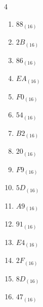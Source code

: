 \begin{multicols}{4}
\begin{enumerate}
  \item $88_{(16)}$

        \phantom{$=136$}

  \item $2B_{(16)}$

        \phantom{$=43$}

  \item $86_{(16)}$

        \phantom{$=134$}

  \item $EA_{(16)}$

        \phantom{$=234$}

  \item $F0_{(16)}$

        \phantom{$=240$}

  \item $54_{(16)}$

        \phantom{$=84$}

  \item $B2_{(16)}$

        \phantom{$=178$}

  \item $20_{(16)}$

        \phantom{$=32$}

  \item $F9_{(16)}$

        \phantom{$=249$}

  \item $5D_{(16)}$

        \phantom{$=93$}

  \item $A9_{(16)}$

        \phantom{$=169$}

\columnbreak %

  \item $91_{(16)}$

        \phantom{$=145$}

  \item $E4_{(16)}$

        \phantom{$=228$}

  \item $2F_{(16)}$

        \phantom{$=47$}

  \item $8D_{(16)}$

        \phantom{$=141$}

  \item $47_{(16)}$


\end{enumerate}
\end{multicols}
